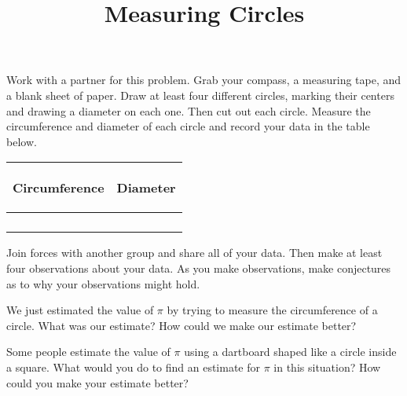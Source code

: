 \documentclass[noauthor, nooutcomes, handout]{ximera}
\title{Measuring Circles}
\begin{document}
\begin{abstract}
\end{abstract}
\maketitle



\begin{problem} 
Work with a partner for this problem. Grab your compass, a measuring tape, and a blank sheet of paper. Draw at least four different circles, marking their centers and drawing a diameter on each one. Then cut out each circle. Measure the circumference and diameter of each circle and record your data in the table below.
\vskip 0.1in
\begin{tabular}{|p{2.2in}|p{2.2in}|}
\hline
\begin{center} Circumference \end{center} & \begin{center} Diameter \end{center}  \\ \hline
 & \\ [5ex] \hline
 & \\ [5 ex] \hline
 & \\ [5 ex] \hline
 & \\ [5 ex] \hline
\end{tabular}
\end{problem}

\begin{problem}
Join forces with another group and share all of your data. Then make at least four observations about your data.  As you make observations, make conjectures as to why your observations might hold.

\end{problem}

\newpage

\begin{problem}
We just estimated the value of $\pi$ by trying to measure the circumference of a circle. What was our estimate? How could we make our estimate better?
\end{problem}


\begin{problem}
Some people estimate the value of $\pi$ using a dartboard shaped like a circle inside a square. What would you do to find an estimate for $\pi$ in this situation? How could you make your estimate better?
\begin{image} \end{image}
\end{problem}
\end{document}
